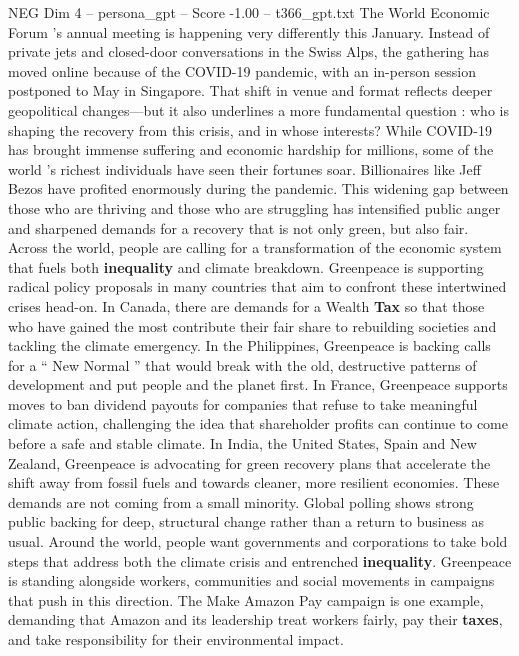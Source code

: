 \begin{textsample}{NEG Dim 4 – persona\_gpt – Score -1.00 – t366\_gpt.txt}  \label{ex:f4_neg_033}
The World Economic Forum ’s annual meeting is happening very differently this January.
Instead of private jets and closed-door conversations in the Swiss Alps, the gathering has moved online because of the COVID-19 pandemic, with an in-person session postponed to May in Singapore.
That shift in venue and format reflects deeper geopolitical changes—but it also underlines a more fundamental question : who is shaping the recovery from this crisis, and in whose interests?
While COVID-19 has brought immense suffering and economic hardship for millions, some of the world ’s richest individuals have seen their fortunes soar.
Billionaires like Jeff Bezos have profited enormously during the pandemic.
This widening gap between those who are thriving and those who are struggling has intensified public anger and sharpened demands for a recovery that is not only green, but also fair.
Across the world, people are calling for a transformation of the economic system that fuels both \textbf{inequality} and climate breakdown.
Greenpeace is supporting radical policy proposals in many countries that aim to confront these intertwined crises head-on.
In Canada, there are demands for a Wealth \textbf{Tax} so that those who have gained the most contribute their fair share to rebuilding societies and tackling the climate emergency.
In the Philippines, Greenpeace is backing calls for a “ New Normal ” that would break with the old, destructive patterns of development and put people and the planet first.
In France, Greenpeace supports moves to ban dividend payouts for companies that refuse to take meaningful climate action, challenging the idea that shareholder profits can continue to come before a safe and stable climate.
In India, the United States, Spain and New Zealand, Greenpeace is advocating for green recovery plans that accelerate the shift away from fossil fuels and towards cleaner, more resilient economies.
These demands are not coming from a small minority.
Global polling shows strong public backing for deep, structural change rather than a return to business as usual.
Around the world, people want governments and corporations to take bold steps that address both the climate crisis and entrenched \textbf{inequality}.
Greenpeace is standing alongside workers, communities and social movements in campaigns that push in this direction.
The Make Amazon Pay campaign is one example, demanding that Amazon and its leadership treat workers fairly, pay their \textbf{taxes}, and take responsibility for their environmental impact.

\end{textsample}
